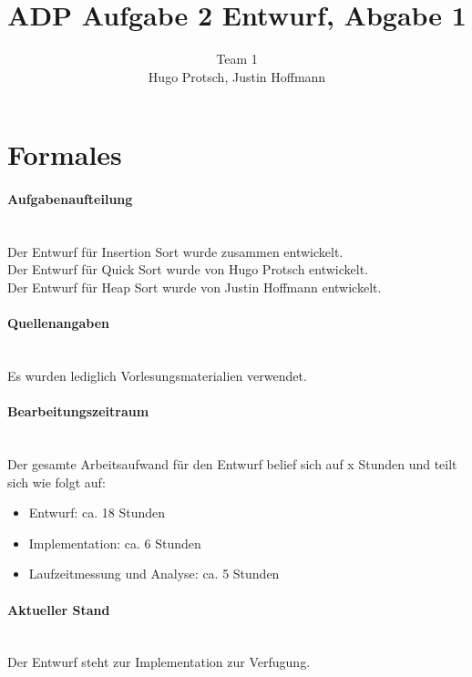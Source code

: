 \documentclass[11pt]{article}
\title{ADP Aufgabe 2 Entwurf, Abgabe 1}
\author{Team 1\\Hugo Protsch, Justin Hoffmann}
\begin{document}
    \maketitle

    \tableofcontents

    \newpage


    \section{Formales}\label{sec:Formales}

    \paragraph*{Aufgabenaufteilung}\mbox{}\\
    Der Entwurf für Insertion Sort wurde zusammen entwickelt.\\
    Der Entwurf für Quick Sort wurde von Hugo Protsch entwickelt.\\
    Der Entwurf für Heap Sort wurde von Justin Hoffmann entwickelt.

    \paragraph*{Quellenangaben}\mbox{}\\
    Es wurden lediglich Vorlesungsmaterialien verwendet.

    \paragraph*{Bearbeitungszeitraum}\mbox{}\\
    Der gesamte Arbeitsaufwand für den Entwurf belief sich auf x Stunden%
    und teilt sich wie folgt auf:
    \begin{itemize}
        \setlength\itemsep{0em}
        \item Entwurf: ca. 18 Stunden
        \item Implementation: ca. 6 Stunden %
        \item Laufzeitmessung und Analyse: ca. 5 Stunden
    \end{itemize}

    \paragraph*{Aktueller Stand}\mbox{}\\
    Der Entwurf steht zur Implementation zur Verfugung.
\end{document}
